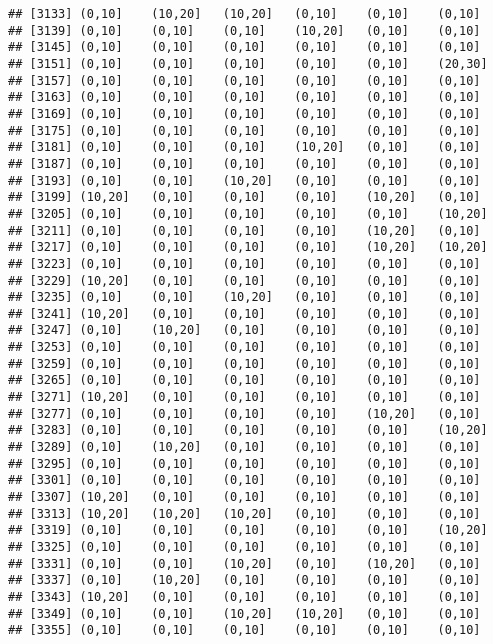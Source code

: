 \documentclass[]{article}
\begin{document}
\begin{verbatim}
## [3133] (0,10]    (10,20]   (10,20]   (0,10]    (0,10]    (0,10]   
## [3139] (0,10]    (0,10]    (0,10]    (10,20]   (0,10]    (0,10]   
## [3145] (0,10]    (0,10]    (0,10]    (0,10]    (0,10]    (0,10]   
## [3151] (0,10]    (0,10]    (0,10]    (0,10]    (0,10]    (20,30]  
## [3157] (0,10]    (0,10]    (0,10]    (0,10]    (0,10]    (0,10]   
## [3163] (0,10]    (0,10]    (0,10]    (0,10]    (0,10]    (0,10]   
## [3169] (0,10]    (0,10]    (0,10]    (0,10]    (0,10]    (0,10]   
## [3175] (0,10]    (0,10]    (0,10]    (0,10]    (0,10]    (0,10]   
## [3181] (0,10]    (0,10]    (0,10]    (10,20]   (0,10]    (0,10]   
## [3187] (0,10]    (0,10]    (0,10]    (0,10]    (0,10]    (0,10]   
## [3193] (0,10]    (0,10]    (10,20]   (0,10]    (0,10]    (0,10]   
## [3199] (10,20]   (0,10]    (0,10]    (0,10]    (10,20]   (0,10]   
## [3205] (0,10]    (0,10]    (0,10]    (0,10]    (0,10]    (10,20]  
## [3211] (0,10]    (0,10]    (0,10]    (0,10]    (10,20]   (0,10]   
## [3217] (0,10]    (0,10]    (0,10]    (0,10]    (10,20]   (10,20]  
## [3223] (0,10]    (0,10]    (0,10]    (0,10]    (0,10]    (0,10]   
## [3229] (10,20]   (0,10]    (0,10]    (0,10]    (0,10]    (0,10]   
## [3235] (0,10]    (0,10]    (10,20]   (0,10]    (0,10]    (0,10]   
## [3241] (10,20]   (0,10]    (0,10]    (0,10]    (0,10]    (0,10]   
## [3247] (0,10]    (10,20]   (0,10]    (0,10]    (0,10]    (0,10]   
## [3253] (0,10]    (0,10]    (0,10]    (0,10]    (0,10]    (0,10]   
## [3259] (0,10]    (0,10]    (0,10]    (0,10]    (0,10]    (0,10]   
## [3265] (0,10]    (0,10]    (0,10]    (0,10]    (0,10]    (0,10]   
## [3271] (10,20]   (0,10]    (0,10]    (0,10]    (0,10]    (0,10]   
## [3277] (0,10]    (0,10]    (0,10]    (0,10]    (10,20]   (0,10]   
## [3283] (0,10]    (0,10]    (0,10]    (0,10]    (0,10]    (10,20]  
## [3289] (0,10]    (10,20]   (0,10]    (0,10]    (0,10]    (0,10]   
## [3295] (0,10]    (0,10]    (0,10]    (0,10]    (0,10]    (0,10]   
## [3301] (0,10]    (0,10]    (0,10]    (0,10]    (0,10]    (0,10]   
## [3307] (10,20]   (0,10]    (0,10]    (0,10]    (0,10]    (0,10]   
## [3313] (10,20]   (10,20]   (10,20]   (0,10]    (0,10]    (0,10]   
## [3319] (0,10]    (0,10]    (0,10]    (0,10]    (0,10]    (10,20]  
## [3325] (0,10]    (0,10]    (0,10]    (0,10]    (0,10]    (0,10]   
## [3331] (0,10]    (0,10]    (10,20]   (0,10]    (10,20]   (0,10]   
## [3337] (0,10]    (10,20]   (0,10]    (0,10]    (0,10]    (0,10]   
## [3343] (10,20]   (0,10]    (0,10]    (0,10]    (0,10]    (0,10]   
## [3349] (0,10]    (0,10]    (10,20]   (10,20]   (0,10]    (0,10]   
## [3355] (0,10]    (0,10]    (0,10]    (0,10]    (0,10]    (0,10]   

\end{verbatim}
\end{document}
